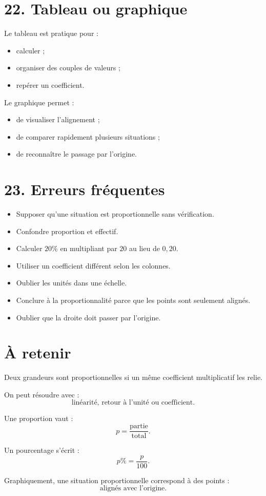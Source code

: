 \section{22. Tableau ou graphique}

Le tableau est pratique pour :
\begin{itemize}
\item calculer ;
\item organiser des couples de valeurs ;
\item repérer un coefficient.
\end{itemize}

Le graphique permet :
\begin{itemize}
\item de visualiser l'alignement ;
\item de comparer rapidement plusieurs situations ;
\item de reconnaître le passage par l'origine.
\end{itemize}

\section{23. Erreurs fréquentes}

\begin{itemize}
\item Supposer qu'une situation est proportionnelle sans vérification.
\item Confondre proportion et effectif.
\item Calculer $20\%$ en multipliant par $20$ au lieu de $0{,}20$.
\item Utiliser un coefficient différent selon les colonnes.
\item Oublier les unités dans une échelle.
\item Conclure à la proportionnalité parce que les points sont seulement alignés.
\item Oublier que la droite doit passer par l'origine.
\end{itemize}

\section{À retenir}

\begin{aretenir}
Deux grandeurs sont proportionnelles si un même coefficient multiplicatif les relie.

On peut résoudre avec :
\[
\boxed{\text{linéarité, retour à l'unité ou coefficient}}.
\]

Une proportion vaut :
\[
\boxed{
p=\dfrac{\text{partie}}{\text{total}}
}.
\]

Un pourcentage s'écrit :
\[
\boxed{
p\%=\dfrac{p}{100}
}.
\]

Graphiquement, une situation proportionnelle correspond à des points :
\[
\boxed{\text{alignés avec l'origine}}.
\]
\end{aretenir}
